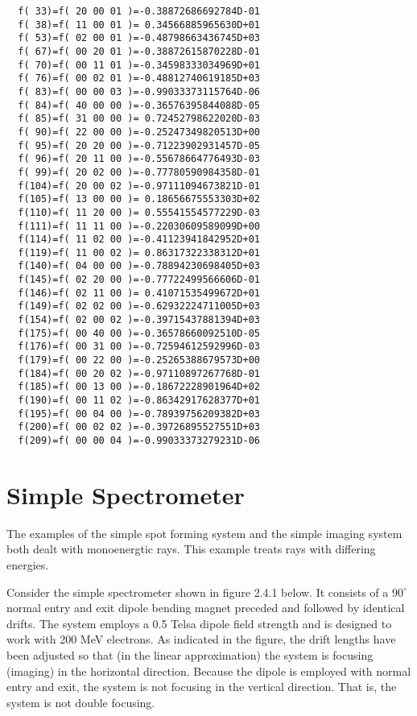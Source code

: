 {\begin{verbatim}
  f( 33)=f( 20 00 01 )=-0.38872686692784D-01
  f( 38)=f( 11 00 01 )= 0.34566885965630D+01
  f( 53)=f( 02 00 01 )=-0.48798663436745D+03
  f( 67)=f( 00 20 01 )=-0.38872615870228D-01
  f( 70)=f( 00 11 01 )=-0.34598333034969D+01
  f( 76)=f( 00 02 01 )=-0.48812740619185D+03
  f( 83)=f( 00 00 03 )=-0.99033373115764D-06
  f( 84)=f( 40 00 00 )=-0.36576395844088D-05
  f( 85)=f( 31 00 00 )= 0.72452798622020D-03
  f( 90)=f( 22 00 00 )=-0.25247349820513D+00
  f( 95)=f( 20 20 00 )=-0.71223902931457D-05
  f( 96)=f( 20 11 00 )=-0.55678664776493D-03
  f( 99)=f( 20 02 00 )=-0.77780590984358D-01
  f(104)=f( 20 00 02 )=-0.97111094673821D-01
  f(105)=f( 13 00 00 )= 0.18656675553303D+02
  f(110)=f( 11 20 00 )= 0.55541554577229D-03
  f(111)=f( 11 11 00 )=-0.22030609589099D+00
  f(114)=f( 11 02 00 )=-0.41123941842952D+01
  f(119)=f( 11 00 02 )= 0.86317322338312D+01
  f(140)=f( 04 00 00 )=-0.78894230698405D+03
  f(145)=f( 02 20 00 )=-0.77722499566606D-01
  f(146)=f( 02 11 00 )= 0.41071535499672D+01
  f(149)=f( 02 02 00 )=-0.62932224711005D+03
  f(154)=f( 02 00 02 )=-0.39715437881394D+03
  f(175)=f( 00 40 00 )=-0.36578660092510D-05
  f(176)=f( 00 31 00 )=-0.72594612592996D-03
  f(179)=f( 00 22 00 )=-0.25265388679573D+00
  f(184)=f( 00 20 02 )=-0.97110897267768D-01
  f(185)=f( 00 13 00 )=-0.18672228901964D+02
  f(190)=f( 00 11 02 )=-0.86342917628377D+01
  f(195)=f( 00 04 00 )=-0.78939756209382D+03
  f(200)=f( 00 02 02 )=-0.39726895527551D+03
  f(209)=f( 00 00 04 )=-0.99033373279231D-06
\end{verbatim}}

\section{Simple Spectrometer}
\label{simplespec}
     The examples of the simple spot forming system and the simple imaging
system both dealt with monoenergtic rays.  This example treats rays with
differing energies.

Consider the simple spectrometer shown in figure 2.4.1 below.  It
consists of a $90^{\circ}$  normal entry and exit dipole bending magnet preceded and
followed by identical drifts.  The system employs a 0.5 Telsa dipole field
strength and is designed to work with 200 MeV electrons.  As indicated in
the figure, the drift lengths have been adjusted so that (in the linear
approximation) the system is focusing (imaging) in the horizontal
direction.  Because the dipole is employed with normal entry and exit, the
system is not focusing in the vertical direction.  That is, the system is
not double focusing.

